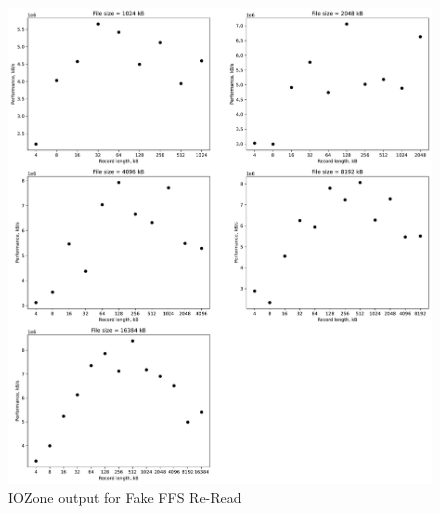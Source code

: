 \begin{figure}[!htb]
	\label{fig:app_bench_fffs_rnd_read}
	\begin{center}
		\includegraphics[width=1.0\textwidth]{figures/benchmarking/fake-ffs/Re-Reader.pdf}
	\end{center}
	\caption{IOZone output for Fake FFS Re-Read}
\end{figure}

